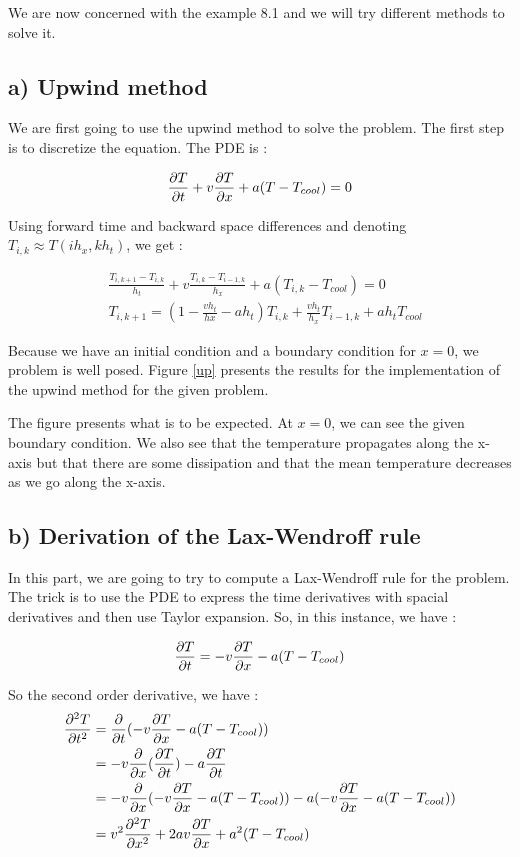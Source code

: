 We are now concerned with the example 8.1 and we will try different methods to solve it.
\subsection*{a) Upwind method} 

We are first going to use the upwind method to solve the problem. The first step is to discretize the equation. The PDE is :

$$\frac{\partial T}{\partial t}+v\frac{\partial T}{\partial x}+ a(T-T_{cool})=0$$

Using forward time and backward space differences and denoting $T_{i,k} \approx T(ih_x,kh_t)$, we get :

\begin{align*}
&\frac{T_{i,k+1}-T_{i,k}}{h_t}+v\frac{T_{i,k}-T_{i-1,k}}{h_x}+a(T_{i,k}-T_{cool})=0\\
&T_{i,k+1} = (1-\frac{vh_t}{hx}-ah_t)T_{i,k}+\frac{vh_t}{h_x}T_{i-1,k}+ah_tT_{cool}
\end{align*}

Because we have an initial condition and a boundary condition for $x=0$, we problem is well posed. Figure \ref{up} presents the results for the implementation of the upwind method for the given problem.

The figure presents what is to be expected. At $x=0$, we can see the given boundary condition. We also see that the temperature propagates along the x-axis but that there are some dissipation and that the mean temperature decreases as we go along the x-axis.

\subsection*{b) Derivation of the Lax-Wendroff rule}
In this part, we are going to try to compute a Lax-Wendroff rule for the problem. The trick is to use the PDE to express the time derivatives with spacial derivatives and then use Taylor expansion. So, in this instance, we have :

$$\frac{\partial T}{\partial t}=-v\frac{\partial T}{\partial x}-a(T-T_{cool})$$

So the second order derivative, we have :
\begin{align*}
\frac{\partial^2T}{\partial t^2} &= \frac{\partial}{\partial t}( -v\frac{\partial T}{\partial x}-a(T-T_{cool}))\\
&=-v\frac{\partial}{\partial x}(\frac{\partial T}{\partial t})-a\frac{\partial T}{\partial t}\\
&=-v\frac{\partial}{\partial x}(-v\frac{\partial T}{\partial x}-a(T-T_{cool})) - a(-v\frac{\partial T}{\partial x}-a(T-T_{cool}))\\
&=v^2\frac{\partial^2 T}{\partial x^2}+2av\frac{\partial T}{\partial x}+a^2(T-T_{cool})
\end{align*}

